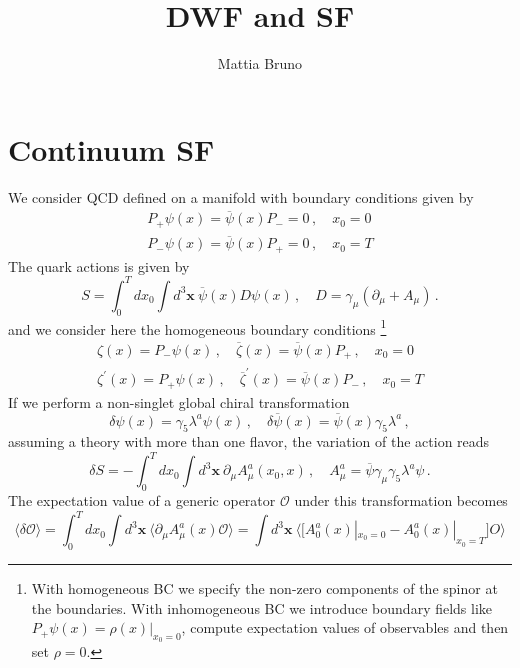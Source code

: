 \documentclass[a4paper]{scrartcl}
\title{DWF and SF}
\author{Mattia Bruno}
\def\psibar{\overline{\psi}}
\def\zetabar{\overline{\zeta}}
\def\mib{\pmb}
\begin{document}
\maketitle

\section{Continuum SF}

We consider QCD defined on a manifold with boundary conditions
given by
\begin{equation}
\begin{gathered}
P_+ \psi(x) = \psibar (x) P_- = 0 \,, \quad x_0=0\\
P_- \psi(x) = \psibar (x) P_+ = 0 \,, \quad x_0=T
\end{gathered}
\end{equation}
The quark actions is given by
\begin{equation}
S = \int_0^T d x_0 \int d^3 {\mib x} \ 
\psibar (x) D \psi(x) \,, \quad 
D = \gamma_\mu (\partial_\mu + A_\mu) \,.
\end{equation}
and we consider here the homogeneous boundary conditions 
\footnote{With homogeneous BC we specify the 
non-zero components of the spinor at the boundaries. 
With inhomogeneous BC we introduce boundary fields 
like $P_+ \psi(x) =\rho(x) |_{x_0=0}$, compute 
expectation values of observables and then
set $\rho=0$.}
\begin{equation}
\begin{gathered}
\zeta(x) = P_- \psi(x) \,, \quad \zetabar(x) = \psibar(x) P_+ \,, \quad x_0=0 \\ 
\zeta^\prime(x) = P_+ \psi(x) \,, \quad \zetabar^\prime(x) = \psibar(x) P_- \,, \quad x_0=T 
\end{gathered}
\end{equation}
If we perform a non-singlet global chiral transformation 
\begin{equation}
\delta \psi(x) = \gamma_5 \lambda^a \psi(x) \,, \quad
\delta \psibar(x) = \psibar(x) \gamma_5 \lambda^a \,,
\end{equation}
assuming a theory with more than one flavor, 
the variation of the action reads
\begin{equation}
\delta S = - 
\int_0^T d x_0 \int d^3 {\mib x} \ 
\partial_\mu A_\mu^a(x_0,x) \,, \quad A^a_\mu = \psibar \gamma_\mu \gamma_5 \lambda^a \psi \,.
\end{equation}
The expectation value of a generic operator $\mathcal O$ 
under this transformation becomes
\begin{equation}
\langle \delta \mathcal O \rangle = 
\int_0^T d x_0 \int d^3 {\mib x} \ 
\langle \partial_\mu A_\mu^a(x) \mathcal O \rangle =  \int d^3 {\mib x} \
\langle \big[ A_0^a(x)|_{x_0=0} - A_0^a(x)|_{x_0=T} \big] O \rangle
\end{equation}
\end{document}
